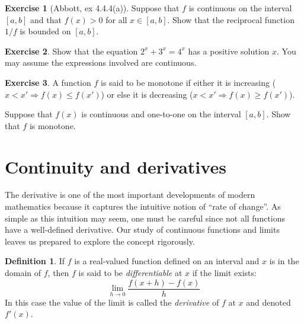 \documentclass[11pt,oneside]{amsbook}
\newcommand{\NN}{\mathbb N}
\theoremstyle{definition}
\newtheorem{exerc}{Exercise}[section]
\theoremstyle{plain}
\theoremstyle{definition}
\newtheorem{defn}[thm]{Definition}
\theoremstyle{remark}
\numberwithin{equation}{section}
\numberwithin{figure}{section}
\begin{document}

\begin{exerc}[Abbott, ex 4.4.4(a)]
  Suppose that $f$ is continuous on the interval $[a,b]$ and that $f(x)>0$ for all $x\in[a,b]$.  Show that the reciprocal function $1/f$ is bounded on $[a,b]$.
\end{exerc}

\begin{exerc}
  Show that the equation $2^x+3^x=4^x$ has a positive solution $x$. You may assume the expressions involved are continuous.
\end{exerc}

\begin{exerc}
  A function $f$ is said to be monotone if either it is increasing ($x<x'\Rightarrow f(x)\leq f(x')$) or else it is decreasing ($x<x'\Rightarrow f(x)\geq f(x')$).

  Suppose that $f(x)$ is continuous and one-to-one on the interval $[a,b]$. Show that $f$ is monotone.
\end{exerc}



\newpage
\section{Continuity and derivatives}

The derivative is one of the most important developments of modern mathematics because it captures the intuitive notion of ``rate of change''. As simple as this intuition may seem, one must be careful since not all functions have a well-defined derivative. Our study of continuous functions and limits leaves us prepared to explore the concept rigorously.

\begin{defn}
If $f$ is a real-valued function defined on an interval and $x$ is in the domain of $f$, then $f$ is said to be \emph{differentiable} at $x$ if the limit exists:
\[\lim_{h\to0}\frac{f(x+h)-f(x)}{h}
\]
In this case the value of the limit is called the \emph{derivative} of $f$ at $x$ and denoted $f'(x)$.
\end{defn}
\end{document}

